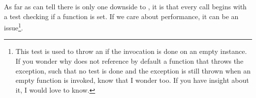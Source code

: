 As far as can tell there is only one downside to ,
it is that every call begins with a test checking if a function is
set. If we care about performance, it can be an issue\footnote{This
  test is used to throw an  if the
  invocation is done on an empty instance. If you wonder why
   does not reference by default a function that
  throws the exception, such that no test is done and the exception is
  still thrown when an empty function is invoked, know that I wonder
  too. If you have insight about it, I would love to know.}.

